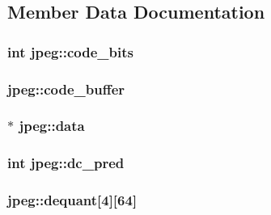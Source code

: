 \subsection{Member Data Documentation}
\hypertarget{structjpeg_a6d1b20b5d9d253006fde4e4dd8ab8c04}{}
\subsubsection[{code\+\_\+bits}]{\setlength{\rightskip}{0pt plus 5cm}int jpeg\+::code\+\_\+bits}\label{structjpeg_a6d1b20b5d9d253006fde4e4dd8ab8c04}
\hypertarget{structjpeg_abfc7f6a333ba3517e669e3e58113bbca}{}
\subsubsection[{code\+\_\+buffer}]{ jpeg\+::code\+\_\+buffer}\label{structjpeg_abfc7f6a333ba3517e669e3e58113bbca}
\hypertarget{structjpeg_a7aed10946c4fd8ad8c0a1e3ff0cd075a}{}
\subsubsection[{data}]{$\ast$ jpeg\+::data}\label{structjpeg_a7aed10946c4fd8ad8c0a1e3ff0cd075a}
\hypertarget{structjpeg_ab09c873c011a6cf5f708973697a313a6}{}
\subsubsection[{dc\+\_\+pred}]{\setlength{\rightskip}{0pt plus 5cm}int jpeg\+::dc\+\_\+pred}\label{structjpeg_ab09c873c011a6cf5f708973697a313a6}
\hypertarget{structjpeg_aae820981dde2c49bc05b6e1298143d21}{}
\subsubsection[{dequant}]{ jpeg\+::dequant\mbox{[}4\mbox{]}\mbox{[}64\mbox{]}}\label{structjpeg_aae820981dde2c49bc05b6e1298143d21}
\hypertarget{structjpeg_a5234104744a9edef60b6080fadd90ebe}{}
